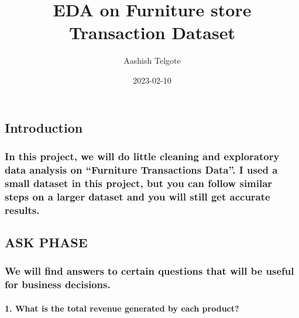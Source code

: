 \documentclass[
]{article}
\title{EDA on Furniture store Transaction Dataset}
\author{Aashish Telgote}
\date{2023-02-10}
\begin{document}
\maketitle

\hypertarget{introduction}{%
\subsection{Introduction}\label{introduction}}

\hypertarget{in-this-project-we-will-do-little-cleaning-and-exploratory-data-analysis-on-furniture-transactions-data.-i-used-a-small-dataset-in-this-project-but-you-can-follow-similar-steps-on-a-larger-dataset-and-you-will-still-get-accurate-results.}{%
\subsubsection{In this project, we will do little cleaning and
exploratory data analysis on ``Furniture Transactions Data''. I used a
small dataset in this project, but you can follow similar steps on a
larger dataset and you will still get accurate
results.}\label{in-this-project-we-will-do-little-cleaning-and-exploratory-data-analysis-on-furniture-transactions-data.-i-used-a-small-dataset-in-this-project-but-you-can-follow-similar-steps-on-a-larger-dataset-and-you-will-still-get-accurate-results.}}

\hypertarget{ask-phase}{%
\subsection{ASK PHASE}\label{ask-phase}}

\hypertarget{we-will-find-answers-to-certain-questions-that-will-be-useful-for-business-decisions.}{%
\subsubsection{We will find answers to certain questions that will be
useful for business
decisions.}\label{we-will-find-answers-to-certain-questions-that-will-be-useful-for-business-decisions.}}

\hypertarget{what-is-the-total-revenue-generated-by-each-product}{%
\paragraph{1. What is the total revenue generated by each
product?}\label{what-is-the-total-revenue-generated-by-each-product}}
\end{document}
